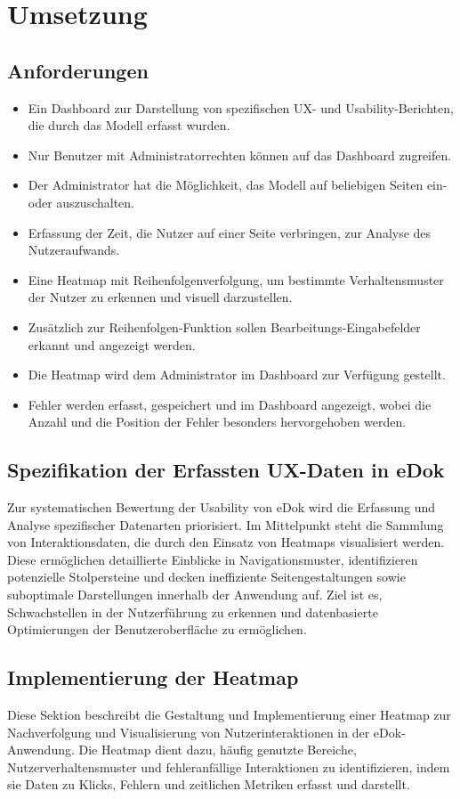 \documentclass[12pt,oneside]{article}
\begin{document}
 \section{Umsetzung}
\subsection{Anforderungen}
\begin{itemize}
\item Ein Dashboard zur Darstellung von spezifischen UX- und Usability-Berichten, die durch das Modell erfasst wurden.
\item Nur Benutzer mit Administratorrechten können auf das Dashboard zugreifen.
\item Der Administrator hat die Möglichkeit, das Modell auf beliebigen Seiten ein- oder auszuschalten.
\item Erfassung der Zeit, die Nutzer auf einer Seite verbringen, zur Analyse des Nutzeraufwands.
\item Eine Heatmap mit Reihenfolgenverfolgung, um bestimmte Verhaltensmuster der Nutzer zu erkennen und visuell   darzustellen.
\item Zusätzlich zur Reihenfolgen-Funktion sollen Bearbeitungs-Eingabefelder erkannt und angezeigt werden.
\item Die Heatmap wird dem Administrator im Dashboard zur Verfügung gestellt.
\item Fehler werden erfasst, gespeichert und im Dashboard angezeigt, wobei die Anzahl und die Position der Fehler besonders hervorgehoben werden.

\end{itemize}
\subsection{Spezifikation der Erfassten UX-Daten in eDok}

Zur systematischen Bewertung der Usability von eDok wird die Erfassung und Analyse spezifischer Datenarten priorisiert. Im Mittelpunkt steht die Sammlung von Interaktionsdaten, die durch den Einsatz von Heatmaps visualisiert werden. Diese ermöglichen detaillierte Einblicke in Navigationsmuster, identifizieren potenzielle Stolpersteine und decken ineffiziente Seitengestaltungen sowie suboptimale Darstellungen innerhalb der Anwendung auf. Ziel ist es, Schwachstellen in der Nutzerführung zu erkennen und datenbasierte Optimierungen der Benutzeroberfläche zu ermöglichen.


\subsection{Implementierung der Heatmap}
Diese Sektion beschreibt die Gestaltung und Implementierung einer Heatmap zur Nachverfolgung und Visualisierung von Nutzerinteraktionen in der eDok-Anwendung. Die Heatmap dient dazu, häufig genutzte Bereiche, Nutzerverhaltensmuster und fehleranfällige Interaktionen zu identifizieren, indem sie Daten zu Klicks, Fehlern und zeitlichen Metriken erfasst und darstellt.
\end{document}
